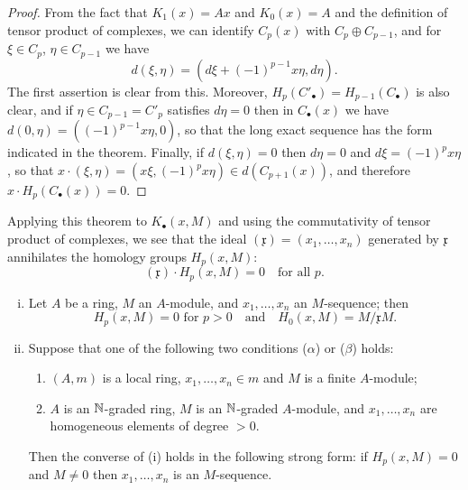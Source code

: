 \begin{proof}
From the fact that $K_1(x) = Ax$ and $K_0(x) = A$ and the definition
of tensor product of complexes, we can identify $C_p(x)$ with $C_p \oplus C_{p-1}$, and
for $\xi \in C_p$, $\eta \in C_{p-1}$ we have
\[
  d(\xi, \eta) = (d\xi + (-1)^{p-1}x\eta, d\eta).
\]
The first assertion is clear from this. Moreover, $H_p(C'_\bullet) = H_{p-1}(C_\bullet)$ is also
clear, and if $\eta \in C_{p-1} = C'_p$ satisfies $d\eta = 0$ then in $C_\bullet(x)$ we have $d(0, \eta) =
((-1)^{p-1}x\eta, 0)$, so that the long exact sequence has the form indicated
in the theorem. Finally, if $d(\xi, \eta) = 0$ then $d\eta = 0$ and $d\xi = (-1)^px\eta$, so
that $x \cdot (\xi, \eta) = (x\xi, (-1)^px\eta) \in d(C_{p+1}(x))$, and therefore $x \cdot H_p(C_\bullet(x)) = 0$.
\end{proof}

Applying this theorem to $K_\bullet(x, M)$ and using the commutativity of
tensor product of complexes, we see that the ideal $(\mathfrak{x}) = (x_1, \ldots, x_n)$
generated by $\mathfrak{x}$ annihilates the homology groups $H_p(x, M)$:
\[
  (\mathfrak{x}) \cdot H_p(x, M) = 0 \quad \text{for all } p.
\]

\begin{theorem}\label{thm:16.5}
\begin{enumerate}[(i)]
  \item Let $A$ be a ring, $M$ an $A$-module, and $x_1, \ldots, x_n$ an $M$-sequence; then
        \[
          H_p(x, M) = 0 \text{ for } p > 0 \quad \text{and} \quad H_0(x, M) = M/\mathfrak{x}M.
        \]
  \item Suppose that one of the following two conditions ($\alpha$) or ($\beta$) holds:
        \begin{enumerate}[($\alpha$)]
          \item $(A, m)$ is a local ring, $x_1, \ldots, x_n \in m$ and $M$ is a finite $A$-module;
          \item $A$ is an $\mathbb{N}$-graded ring, $M$ is an $\mathbb{N}$-graded $A$-module, and $x_1, \ldots, x_n$ are
                homogeneous elements of degree $> 0$.
        \end{enumerate}
        Then the converse of (i) holds in the following strong form: if $H_p(x, M) = 0$
        and $M \neq 0$ then $x_1, \ldots, x_n$ is an $M$-sequence.
\end{enumerate}
\end{theorem}

